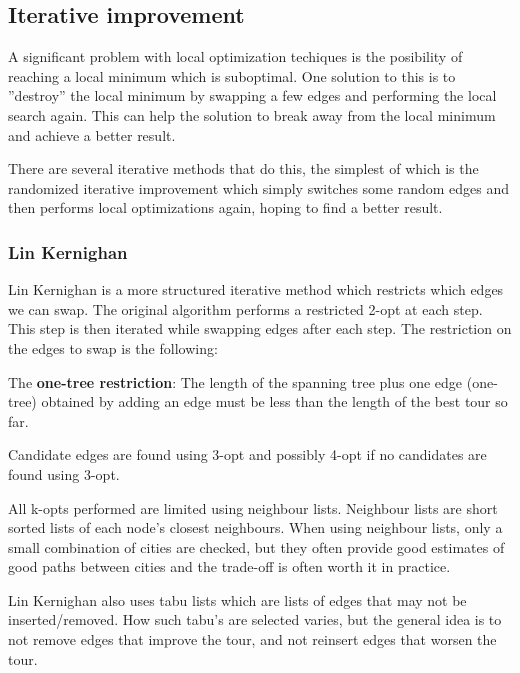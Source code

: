 \documentclass[paper=a4, fontsize=11pt,numbers=endperiod]{scrartcl} %
\numberwithin{equation}{section} %
\numberwithin{figure}{section} %
\numberwithin{table}{section} %
\begin{document}


\subsection{Iterative improvement}
A significant problem with local optimization techiques is the posibility of reaching a local minimum which is suboptimal.
One solution to this is to ''destroy'' the local minimum by swapping a few edges and performing the local search again.
This can help the solution to break away from the local minimum and achieve a better result.

There are several iterative methods that do this, the simplest of which is the randomized iterative improvement which simply switches some random edges and then performs local optimizations again, hoping to find a better result.

\subsubsection{Lin Kernighan}
Lin Kernighan \cite{LK} is a more structured iterative method which restricts which edges we can swap. 
The original algorithm performs a restricted 2-opt at each step. This step is then iterated while swapping edges after each step. The restriction on the edges to swap is the following:

The \textbf{one-tree restriction}:
The length of the spanning tree plus one edge (one-tree) obtained by adding an edge must be less than the length of the best tour so far. \cite{LK2}

Candidate edges are found using 3-opt and possibly 4-opt if no candidates are found using 3-opt.

All k-opts performed are limited using neighbour lists. Neighbour lists are short sorted lists of each node's closest neighbours. When using neighbour lists, only a small combination of cities are checked, but they often provide good estimates of good paths between cities and the trade-off is often worth it in practice.

Lin Kernighan also uses tabu lists which are lists of edges that may not be inserted/removed. How such tabu's are selected varies, but the general idea is to not remove edges that improve the tour, and not reinsert edges that worsen the tour.




\end{document}
